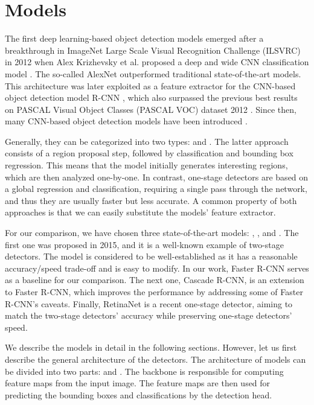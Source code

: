\chapter{Models}
The first deep learning-based object detection models emerged after a
breakthrough in ImageNet Large Scale Visual Recognition Challenge (ILSVRC)
\cite{ILSVRC15} in 2012 when Alex Krizhevsky et al. proposed a deep
and wide CNN classification model \cite{alexnet}. The so-called AlexNet
outperformed traditional state-of-the-art models.  This architecture was
later exploited as a feature extractor for the CNN-based object detection
model R-CNN \cite{rcnn}, which also surpassed the previous best results on
PASCAL Visual Object Classes (PASCAL VOC) dataset 2012 \cite{voc}. Since then,
many CNN-based object detection models have been introduced \cite{odreview}.

Generally, they can be categorized into two types: 
and . The latter approach consists of a region
proposal step, followed by classification and bounding box regression. This
means that the model initially generates interesting regions, which are then
analyzed one-by-one. In contrast, one-stage detectors are based on a global
regression and classification, requiring a single pass through the network,
and thus they are usually faster but less accurate. A common property of
both approaches is that we can easily substitute the models' feature extractor.

For our comparison, we have chosen three state-of-the-art models:  \cite{fasterrcnn},  \cite{cascadercnn}, and
 \cite{retinanet}. The first one was proposed in 2015, and
it is a well-known example of two-stage detectors. The model is considered
to be well-established as it has a reasonable accuracy/speed trade-off
and is easy to modify. In our work, Faster R-CNN serves as a baseline for
our comparison. The next one, Cascade R-CNN, is an extension to Faster
R-CNN, which improves the performance by addressing some of Faster R-CNN's
caveats. Finally, RetinaNet is a recent one-stage detector, aiming to match
the two-stage detectors' accuracy while preserving one-stage detectors' speed.

We describe the models in detail in the following sections. However, let us
first describe the general architecture of the detectors. The architecture
of models can be divided into two parts:  and . The backbone is responsible for computing feature maps from the input
image. The feature maps are then used for predicting the bounding boxes and
classifications by the detection head.

